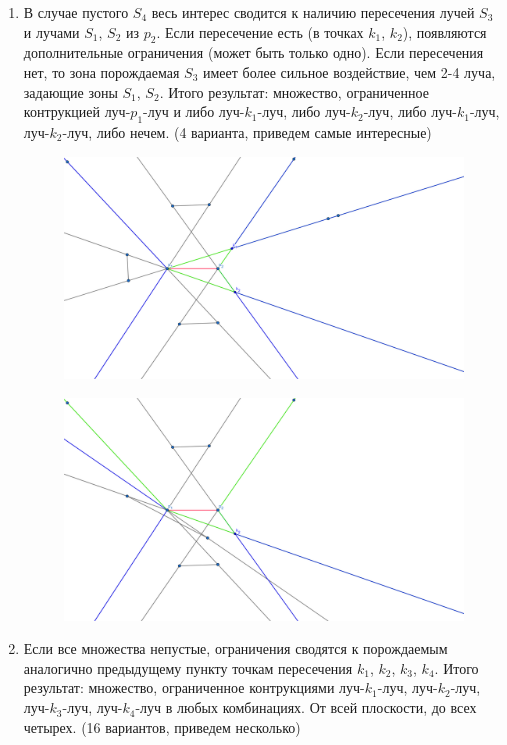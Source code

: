 \documentclass[letterpaper,12pt]{article}
\begin{document}
\begin{enumerate}
\begin{figure}[H]
            \end{figure}
      \item В случае пустого $S_4$ весь интерес сводится к наличию
            пересечения лучей $S_3$ и лучами $S_1$, $S_2$ из $p_2$.
            Если пересечение есть (в точках $k_1$, $k_2$), 
            появляются дополнительные ограничения 
            (может быть только одно). Если пересечения нет, то
            зона порождаемая $S_3$ имеет более сильное
            воздействие, чем 2-4 луча, задающие зоны $S_1$, $S_2$.
            Итого результат: множество, ограниченное контрукцией
            луч-$p_1$-луч и либо луч-$k_1$-луч, либо луч-$k_2$-луч, 
            либо луч-$k_1$-луч, луч-$k_2$-луч, либо нечем.
            (4 варианта, приведем самые интересные)
            \begin{figure}[H]
                  \centering
                  \includegraphics[width=0.5\linewidth]{nozone_3_3.png}
            \end{figure}
            \begin{figure}[H]
                  \centering
                  \includegraphics[width=0.5\linewidth]{nozone_3_4.png}
            \end{figure}
      \item Если все множества непустые, ограничения сводятся к 
            порождаемым аналогично предыдущему пункту точкам
            пересечения $k_1$, $k_2$, $k_3$, $k_4$.
            Итого результат: множество, ограниченное контрукциями
            луч-$k_1$-луч, луч-$k_2$-луч, луч-$k_3$-луч, луч-$k_4$-луч
            в любых комбинациях. От всей плоскости, до всех четырех.
            (16 вариантов, приведем несколько)
            \begin{figure}[H]
                  \centering

\end{figure}
\end{enumerate}
\end{document}
